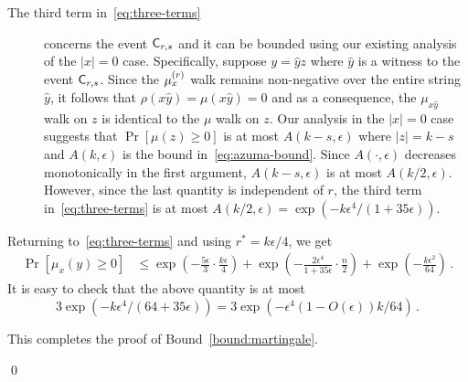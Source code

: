 \begin{description}
  \item[The third term in~\eqref{eq:three-terms}]
  concerns the event $\mathsf{C}_{r,s}$ and it can be bounded using 
  our existing analysis of the $|x|=0$ case. 
  Specifically, suppose $y = \hat{y} z$ where
  $\hat{y}$ is a witness to the event $\mathsf{C}_{r,s}$. 
  Since the $\mu_x^{(r)}$ walk remains non-negative over the entire string $\hat{y}$, 
  it follows that $\rho(x\hat{y}) = \mu(x\hat{y}) = 0$ 
  and as a consequence, the $\mu_{x\hat{y}}$ walk on $z$ is identical to 
  the $\mu$ walk on $z$. 
  Our analysis in the $|x| = 0$ case suggests that 
  $\Pr[\mu(z) \geq 0]$ is at most $A(k-s, \epsilon)$ 
  where $|z| = k - s$ and $A(k, \epsilon)$ is the bound in~\eqref{eq:azuma-bound}. 
  Since $A(\cdot,\epsilon)$ decreases monotonically in the first argument, 
  $A(k-s, \epsilon)$ is at most $A(k/2, \epsilon)$. 
  However, since the last quantity is independent of $r$, 
  the third term in~\eqref{eq:three-terms} is at most 
  $A(k/2, \epsilon) = \exp\left( -k \epsilon^4/(1+35\epsilon) \right)$. 
\end{description}


Returning to~\eqref{eq:three-terms} and using $r^* = k\epsilon/4$, we get
\begin{align*}
\Pr[\mu_x(y) \geq 0] 
 &\leq    \exp\left(-\frac{5 \epsilon}{3} \cdot \frac{k\epsilon}{4} \right)  
        + \exp\left(-\frac{2\epsilon^4}{1 + 35\epsilon} \cdot \frac{n}{2}\right)
        + \exp\left( -\frac{k \epsilon^2}{64} \right)
\, .
\end{align*}
It is easy to check that the above quantity is at most
$$
  3 \exp\left( - k \epsilon^4/(64 + 35 \epsilon) \right) 
= 3 \exp\left( - \epsilon^4 (1 - O(\epsilon) ) k/64 \right)
\,.
$$

This completes the proof of Bound~\ref{bound:martingale}.

\hfill\qed

